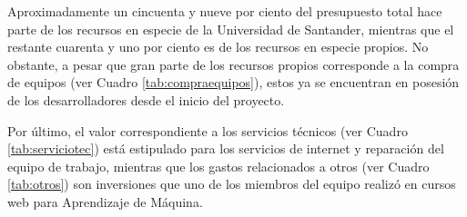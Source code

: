 Aproximadamente un cincuenta y nueve por ciento del presupuesto total hace parte de los recursos en especie de la Universidad de Santander, mientras que el restante cuarenta y uno por ciento es de los recursos en especie propios. No obstante, a pesar que gran parte de los recursos propios corresponde a la compra de equipos (ver Cuadro \ref{tab:compraequipos}), estos ya se encuentran en posesión de los desarrolladores desde el inicio del proyecto. 

Por último, el valor correspondiente a los servicios técnicos (ver Cuadro \ref{tab:serviciotec}) está estipulado para los servicios de internet y reparación del equipo de trabajo, mientras que los gastos relacionados a otros (ver Cuadro \ref{tab:otros}) son inversiones que uno de los miembros del equipo realizó en cursos web para Aprendizaje de Máquina.